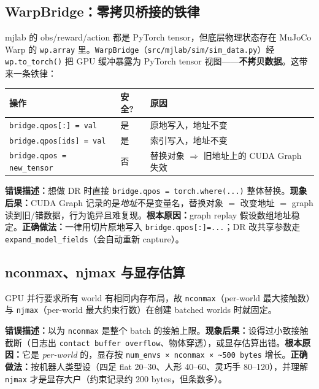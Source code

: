 \subsection{WarpBridge：零拷贝桥接的铁律}

mjlab 的 obs/reward/action 都是 PyTorch tensor，但底层物理状态存在 MuJoCo Warp 的 \verb|wp.array| 里。\verb|WarpBridge|（\verb|src/mjlab/sim/sim_data.py|）经 \verb|wp.to_torch()| 把 GPU 缓冲暴露为 PyTorch tensor 视图——\textbf{不拷贝数据}。这带来一条铁律：

\begin{center}
\small
\begin{tabular}{@{}llp{4.4cm}@{}}
\toprule
操作 & 安全? & 原因 \\
\midrule
\verb|bridge.qpos[:] = val| & 是 & 原地写入，地址不变 \\
\verb|bridge.qpos[ids] = val| & 是 & 索引写入，地址不变 \\
\verb|bridge.qpos = new_tensor| & 否 & 替换对象 $\Rightarrow$ 旧地址上的 CUDA Graph 失效 \\
\bottomrule
\end{tabular}
\end{center}

\begin{pitfall}
\textbf{错误描述：}想做 DR 时直接 \verb|bridge.qpos = torch.where(...)| 整体替换。\textbf{现象后果：}CUDA Graph 记录的是\emph{地址}不是变量名，替换对象 $=$ 改变地址 $=$ graph 读到旧/错数据，行为诡异且难复现。\textbf{根本原因：}graph replay 假设数组地址稳定。\textbf{正确做法：}一律用切片原地写入 \verb|bridge.qpos[:]=...|；DR 改共享参数走 \verb|expand_model_fields|（会自动重新 capture）。
\end{pitfall}

\subsection{nconmax、njmax 与显存估算}

GPU 并行要求所有 world 有相同内存布局，故 \verb|nconmax|（per-world 最大接触数）与 \verb|njmax|（per-world 最大约束行数）在创建 batched worlds 时就固定。

\begin{pitfall}
\textbf{错误描述：}以为 \verb|nconmax| 是整个 batch 的接触上限。\textbf{现象后果：}设得过小致接触截断（日志出 \verb|contact buffer overflow|、物体穿透），或显存估算出错。\textbf{根本原因：}它是 \emph{per-world} 的，显存按 \verb|num_envs × nconmax × ~500 bytes| 增长。\textbf{正确做法：}按机器人类型设（四足 flat 20--30、人形 40--60、灵巧手 80--120），并理解 \verb|njmax| 才是显存大户（约束记录约 200 bytes，但条数多）。
\end{pitfall}

